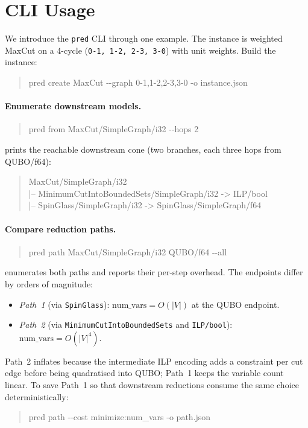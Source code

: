 \documentclass{article}
\begin{document}
\section{CLI Usage}\label{app:cli}

We introduce the \texttt{pred} CLI through one example. The instance is weighted MaxCut on a 4-cycle (\texttt{0-1, 1-2, 2-3, 3-0}) with unit weights. Build the instance:
\begin{quote}\ttfamily\small
pred create MaxCut -{}-graph 0-1,1-2,2-3,3-0 -o instance.json
\end{quote}

\paragraph{Enumerate downstream models.}
\begin{quote}\ttfamily\small
pred from MaxCut/SimpleGraph/i32 -{}-hops 2
\end{quote}
prints the reachable downstream cone (two branches, each three hops from QUBO/f64):
\begin{quote}\ttfamily\small
MaxCut/SimpleGraph/i32\\
\hspace*{1em}|-- MinimumCutIntoBoundedSets/SimpleGraph/i32 -> ILP/bool\\
\hspace*{1em}|-- SpinGlass/SimpleGraph/i32 -> SpinGlass/SimpleGraph/f64
\end{quote}

\paragraph{Compare reduction paths.}
\begin{quote}\ttfamily\small
pred path MaxCut/SimpleGraph/i32 QUBO/f64 -{}-all
\end{quote}
enumerates both paths and reports their per-step overhead. The endpoints differ by orders of magnitude:
\begin{itemize}
\setlength\itemsep{1pt}
\item \emph{Path~1} (via \texttt{SpinGlass}): $\text{num\_vars} = O(|V|)$ at the QUBO endpoint.
\item \emph{Path~2} (via \texttt{MinimumCutIntoBoundedSets} and \texttt{ILP/bool}): $\text{num\_vars} = O(|V|^4)$.
\end{itemize}
Path~2 inflates because the intermediate ILP encoding adds a constraint per cut edge before being quadratised into QUBO; Path~1 keeps the variable count linear. To save Path~1 so that downstream reductions consume the same choice deterministically:
\begin{quote}\ttfamily\small
pred path -{}-cost minimize:num\_vars -o path.json
\end{quote}
\end{document}

